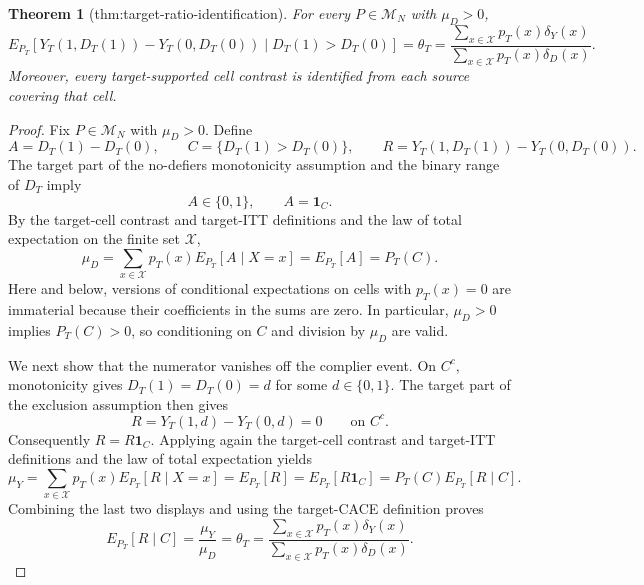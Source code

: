 \documentclass{article}
\newtheorem{theorem}{Theorem}
\begin{document}
\begin{theorem}[thm:target-ratio-identification]\label{thm:target-ratio-identification}
For every \(P\in\mathcal M_N\) with \(\mu_D>0\),
\[
E_{P_T}\!\left[Y_T(1,D_T(1))-Y_T(0,D_T(0))\mid D_T(1)>D_T(0)\right]
=\theta_T
=\frac{\sum_{x\in\mathcal X}p_T(x)\delta_Y(x)}
{\sum_{x\in\mathcal X}p_T(x)\delta_D(x)}.
\]
Moreover, every target-supported cell contrast is identified from each source covering that cell.
\end{theorem}
\begin{proof}
Fix \(P\in\mathcal M_N\) with \(\mu_D>0\).  Define
\[
A=D_T(1)-D_T(0),\qquad
C=\{D_T(1)>D_T(0)\},
\qquad
R=Y_T(1,D_T(1))-Y_T(0,D_T(0)).
\]
The target part of the no-defiers monotonicity assumption and the binary range of \(D_T\) imply
\[
A\in\{0,1\},\qquad A=\mathbf 1_C.
\]
By the target-cell contrast and target-ITT definitions and the law of total expectation on the finite set \(\mathcal X\),
\[
\mu_D
=\sum_{x\in\mathcal X}p_T(x)E_{P_T}[A\mid X=x]
=E_{P_T}[A]
=P_T(C).
\]
Here and below, versions of conditional expectations on cells with \(p_T(x)=0\) are immaterial because their coefficients in the sums are zero.  In particular, \(\mu_D>0\) implies \(P_T(C)>0\), so conditioning on \(C\) and division by \(\mu_D\) are valid.

We next show that the numerator vanishes off the complier event.  On \(C^c\), monotonicity gives \(D_T(1)=D_T(0)=d\) for some \(d\in\{0,1\}\).  The target part of the exclusion assumption then gives
\[
R=Y_T(1,d)-Y_T(0,d)=0\qquad\text{on }C^c.
\]
Consequently \(R=R\mathbf 1_C\).  Applying again the target-cell contrast and target-ITT definitions and the law of total expectation yields
\[
\mu_Y
=\sum_{x\in\mathcal X}p_T(x)E_{P_T}[R\mid X=x]
=E_{P_T}[R]
=E_{P_T}[R\mathbf 1_C]
=P_T(C)E_{P_T}[R\mid C].
\]
Combining the last two displays and using the target-CACE definition proves
\[
E_{P_T}[R\mid C]
=\frac{\mu_Y}{\mu_D}
=\theta_T
=\frac{\sum_{x\in\mathcal X}p_T(x)\delta_Y(x)}
{\sum_{x\in\mathcal X}p_T(x)\delta_D(x)}.
\]


\end{proof}
\end{document}
